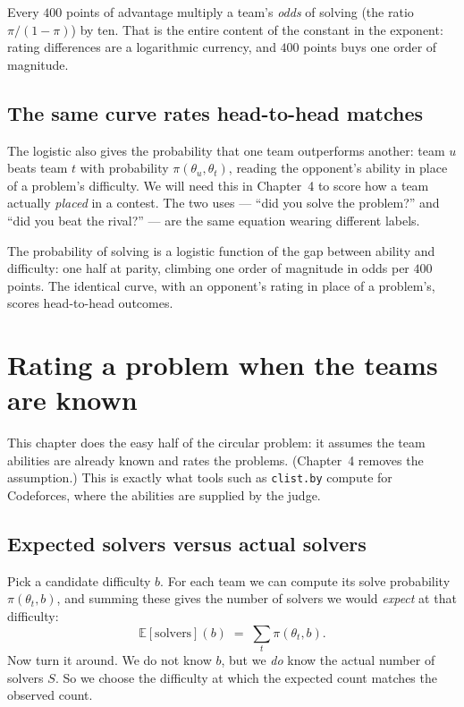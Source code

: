 \documentclass[11pt]{report}
\newcommand{\E}{\mathbb{E}}
\theoremstyle{definition}
\numberwithin{equation}{chapter}
\begin{document}
\begin{intuition}
Every $400$ points of advantage multiply a team's \emph{odds} of solving (the
ratio $\pi/(1-\pi)$) by ten. That is the entire content of the constant in the
exponent: rating differences are a logarithmic currency, and $400$ points buys
one order of magnitude.
\end{intuition}

\section{The same curve rates head-to-head matches}

The logistic also gives the probability that one team outperforms another: team
$u$ beats team $t$ with probability $\pi(\theta_u,\theta_t)$, reading the
opponent's ability in place of a problem's difficulty. We will need this in
Chapter~4 to score how a team actually \emph{placed} in a contest. The two uses
--- ``did you solve the problem?'' and ``did you beat the rival?'' --- are the
same equation wearing different labels.

\begin{takeaway}
The probability of solving is a logistic function of the gap between ability and
difficulty: one half at parity, climbing one order of magnitude in odds per $400$
points. The identical curve, with an opponent's rating in place of a problem's,
scores head-to-head outcomes.
\end{takeaway}

\chapter{Rating a problem when the teams are known}

This chapter does the easy half of the circular problem: it assumes the team
abilities are already known and rates the problems. (Chapter~4 removes the
assumption.) This is exactly what tools such as \texttt{clist.by} compute for
Codeforces, where the abilities are supplied by the judge.

\section{Expected solvers versus actual solvers}

Pick a candidate difficulty $b$. For each team we can compute its solve
probability $\pi(\theta_t,b)$, and summing these gives the number of solvers we
would \emph{expect} at that difficulty:
\begin{equation}\label{eq:expected}
  \E[\text{solvers}](b)\;=\;\sum_{t}\pi(\theta_t,b).
\end{equation}
Now turn it around. We do not know $b$, but we \emph{do} know the actual number
of solvers $S$. So we choose the difficulty at which the expected count matches
the observed count.
\end{document}

